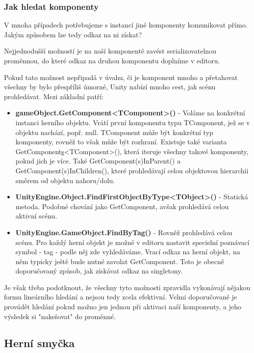 \subsubsection*{Jak hledat komponenty} \label{howToSearchForComponentsSubsubsection}

V mnoha případech potřebujeme s instancí jiné komponenty komunikovat přímo. Jakým způsobem lze tedy odkaz na ni získat?

Nejjednodušší možností je na naší komponentě zavést serializovatelnou proměnnou, do které odkaz na druhou komponentu doplníme v editoru. 

Pokud tato možnost nepřipadá v úvahu, či je komponent mnoho a přetahovat všechny by bylo přespříliš úmorné, Unity nabízí mnoho cest, jak scénu prohledávat. Mezi základní patří:

\begin{itemize}
    \item \textbf{gameObject.GetComponent<TComponent>()} - Voláme na konkrétní instanci herního objektu. Vrátí první komponentu typu TComponent, jež se v objektu nachází, popř. null. TComponent může být konkrétní typ komponenty, rovněž to však může být rozhraní. Existuje také varianta GetComponent\underline{s}<TComponent>(), která iteruje všechny takové komponenty, pokud jich je více. Také GetComponent(s)InParent() a GetComponent(s)InChildren(), které prohledávají celou objektovou hierarchii směrem od objektu nahoru/dolu.
    \item \textbf{UnityEngine.Object.FindFirstObjectByType<TObject>()} - Statická metoda. Podobné chování jako GetComponent, avšak prohledává celou aktivní scénu. 
    \item \textbf{UnityEngine.GameObject.FindByTag()} - Rovněž prohledává celou scénu. Pro každý herní objekt je možné v editoru nastavit specielní poznávací symbol - tag - podle něj zde vyhledáváme. Vrací odkaz na herní objekt, na něm typicky ještě bude nutné zavolat GetComponent. Toto je obecně doporučovaný způsob, jak získávat odkaz na singletony.
\end{itemize}

Je však třeba podotknout, že všechny tyto možnosti zpravidla vykonávají nějakou formu lineárního hledání a nejsou tedy zcela efektivní. Velmi doporučované je provádět hledání pokud možno jen jednou při aktivaci naší komponenty, a jeho výsledek si "nakešovat" do proměnné.

\subsection{Herní smyčka}

